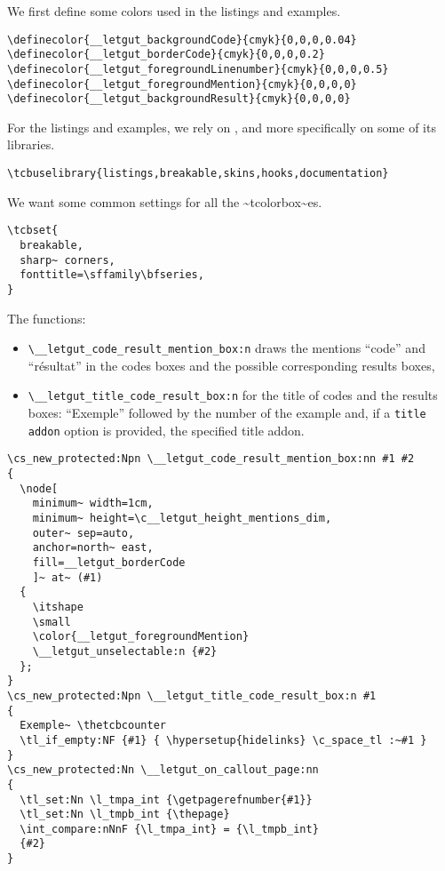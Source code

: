 \documentclass{letgut}
\begin{document}
We first define some colors used in the listings and examples.

\begin{lstlisting}
\definecolor{__letgut_backgroundCode}{cmyk}{0,0,0,0.04}
\definecolor{__letgut_borderCode}{cmyk}{0,0,0,0.2}
\definecolor{__letgut_foregroundLinenumber}{cmyk}{0,0,0,0.5}
\definecolor{__letgut_foregroundMention}{cmyk}{0,0,0,0}
\definecolor{__letgut_backgroundResult}{cmyk}{0,0,0,0}
\end{lstlisting}

For the listings and examples, we rely on , and more
specifically on some of its libraries.

\begin{lstlisting}
\tcbuselibrary{listings,breakable,skins,hooks,documentation}
\end{lstlisting}

We want some common settings for all the \textasciitilde{}tcolorbox\textasciitilde{}es.

\begin{lstlisting}
\tcbset{
  breakable,
  sharp~ corners,
  fonttitle=\sffamily\bfseries,
}
\end{lstlisting}

The functions:

\begin{itemize}
\item \lstinline+\__letgut_code_result_mention_box:n+ draws the mentions “code” and “résultat”
in the codes boxes and the possible corresponding results boxes,
\item \lstinline+\__letgut_title_code_result_box:n+ for the title of codes and the results
boxes: “Exemple” followed by the number of the example and, if a \lstinline+title addon+
option is provided, the specified title addon.
\end{itemize}

\begin{lstlisting}
\cs_new_protected:Npn \__letgut_code_result_mention_box:nn #1 #2
{
  \node[
    minimum~ width=1cm,
    minimum~ height=\c__letgut_height_mentions_dim,
    outer~ sep=auto,
    anchor=north~ east,
    fill=__letgut_borderCode
    ]~ at~ (#1)
  {
    \itshape
    \small
    \color{__letgut_foregroundMention}
    \__letgut_unselectable:n {#2}
  };
}
\cs_new_protected:Npn \__letgut_title_code_result_box:n #1
{
  Exemple~ \thetcbcounter
  \tl_if_empty:NF {#1} { \hypersetup{hidelinks} \c_space_tl :~#1 }
}
\cs_new_protected:Nn \__letgut_on_callout_page:nn
{
  \tl_set:Nn \l_tmpa_int {\getpagerefnumber{#1}}
  \tl_set:Nn \l_tmpb_int {\thepage}
  \int_compare:nNnF {\l_tmpa_int} = {\l_tmpb_int}
  {#2}
}
\end{lstlisting}
\end{document}
